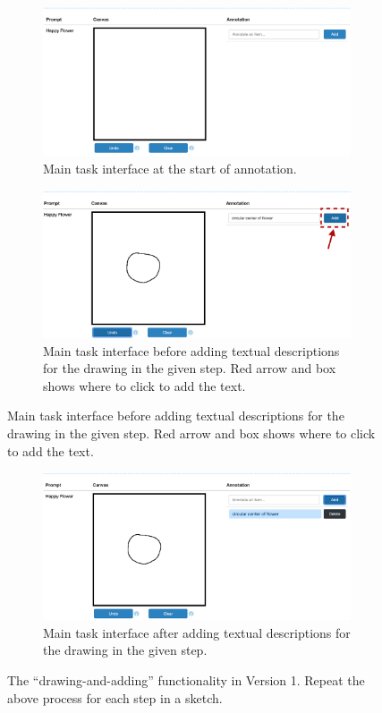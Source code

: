 \begin{figure}[!htb]
\begin{subfigure}{\textwidth}
    \centering
    \includegraphics[width=.8\linewidth]{data_collection/v1_empty_table.png}  
    \caption{Main task interface at the start of annotation.}
    \label{v1.main_task.1.a}
\end{subfigure}
\newline
\begin{subfigure}{\textwidth}
    \centering
    \includegraphics[width=.8\linewidth]{data_collection/v1_before_enter_text.png}  
    \caption{Main task interface before adding textual descriptions for the drawing in the given step. Red arrow and box shows where to click to add the text.}
    \label{v1.main_task.1.b}
\end{subfigure}
\end{figure}

\begin{figure}[!htb]
\ContinuedFloat
\begin{subfigure}{\textwidth}
    \centering
    \includegraphics[width=.8\linewidth]{data_collection/v1_after_enter_text.png}  
    \caption{Main task interface after adding textual descriptions for the drawing in the given step.}
    \label{v1.main_task.1.c}
\end{subfigure}
\caption{The ``drawing-and-adding'' functionality in Version 1. Repeat the above process for each step in a sketch.}
\label{v1.main_task.1}
\end{figure}

